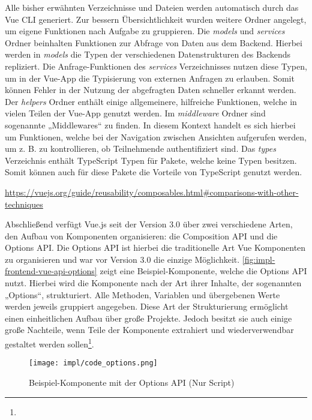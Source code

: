 Alle bisher erwähnten Verzeichnisse und Dateien werden automatisch durch das Vue
CLI generiert. Zur bessern Übersichtlichkeit wurden weitere Ordner angelegt, um
eigene Funktionen nach Aufgabe zu gruppieren. Die \textit{models} und
\textit{services} Ordner beinhalten Funktionen zur Abfrage von Daten aus dem
Backend. Hierbei werden in \textit{models} die Typen der verschiedenen
Datenstrukturen des Backends repliziert. Die Anfrage-Funktionen des
\textit{services} Verzeichnisses nutzen diese Typen, um in der Vue-App die
Typisierung von externen Anfragen zu erlauben. Somit können Fehler in der
Nutzung der abgefragten Daten schneller erkannt werden. Der \textit{helpers}
Ordner enthält einige allgemeinere, hilfreiche Funktionen, welche in vielen
Teilen der Vue-App genutzt werden. Im \textit{middleware} Ordner sind sogenannte
„Middlewares“ zu finden. In diesem Kontext handelt es sich hierbei um
Funktionen, welche bei der Navigation zwischen Ansichten aufgerufen werden, um
z. B. zu kontrollieren, ob Teilnehmende authentifiziert sind. Das \textit{types}
Verzeichnis enthält TypeScript Typen für Pakete, welche keine Typen besitzen.
Somit können auch für diese Pakete die Vorteile von TypeScript genutzt werden.


\urldef\vuemixin\url{https://vuejs.org/guide/reusability/composables.html#comparisons-with-other-techniques}

Abschließend verfügt Vue.js seit der Version 3.0 über zwei verschiedene Arten,
den Aufbau von Komponenten organisieren: die Composition API und die Options
API. Die Options API ist hierbei die traditionelle Art Vue Komponenten zu
organisieren und war vor Version 3.0 die einzige Möglichkeit.
\autoref{fig:impl-frontend-vue-api-options} zeigt eine Beispiel-Komponente,
welche die Options API nutzt. Hierbei wird die Komponente nach der Art ihrer
Inhalte, der sogenannten „Options“, strukturiert. Alle Methoden, Variablen und
übergebenen Werte werden jeweils gruppiert angegeben. Diese Art der
Strukturierung ermöglicht einen einheitlichen Aufbau über große Projekte. Jedoch
besitzt sie auch einige große Nachteile, wenn Teile der Komponente extrahiert
und wiederverwendbar gestaltet werden sollen\footnote{\vuemixin}.

\begin{figure}[htpb]
    \centering
    \texttt{[image: impl/code\_options.png]}
    \caption{Beispiel-Komponente mit der Options API (Nur Script)}
    \label{fig:impl-frontend-vue-api-options}
\end{figure}

